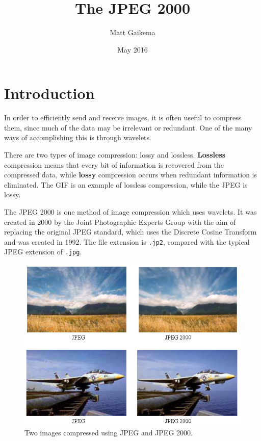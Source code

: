 \documentclass[titlepage,12pt]{article}
\title{The JPEG 2000}
\author{Matt Gaikema}
\date{May 2016}
\begin{document}
\maketitle

\section{Introduction}

In order to efficiently send and receive images, it is often useful to compress them, 
since much of the data may be irrelevant or redundant.
One of the many ways of accomplishing this is through wavelets.

There are two types of image compression: lossy and lossless.
\textbf{Lossless} compression means that every bit of information is recovered from the compressed data,
while \textbf{lossy} compression occurs when redundant information is eliminated.
The GIF is an example of lossless compression, while the JPEG is lossy.

The JPEG 2000 is one method of image compression which uses wavelets.
It was created in 2000 by the Joint Photographic Experts Group with the aim of replacing the original JPEG standard, 
which uses the Discrete Cosine Transform and was created in 1992.
The file extension is \verb|.jp2|, compared with the typical JPEG extension of \verb|.jpg|.

\begin{figure}[h]
	\centering
	\includegraphics[scale=0.4]{resources/comparison.png}
	\caption{Two images compressed using JPEG and JPEG 2000.\cite{comparison}}
	\label{fig:compare}
\end{figure}
\end{document}
